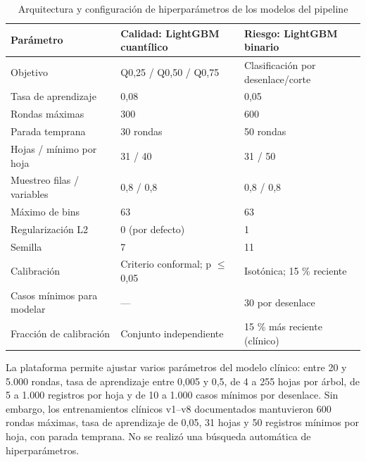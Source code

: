 \begin{table}[t]
\centering
\caption{Arquitectura y configuración de hiperparámetros de los modelos del pipeline}
\label{tab:1}
\footnotesize
\setlength{\tabcolsep}{2pt}
\begin{tabular}{@{}p{}p{}p{}@{}}
\toprule
\textbf{Parámetro} & \textbf{Calidad: LightGBM cuantílico} & \textbf{Riesgo: LightGBM binario} \\
\midrule
Objetivo & Q0,25 / Q0,50 / Q0,75 & Clasificación por desenlace/corte \\
Tasa de aprendizaje & 0,08 & 0,05 \\
Rondas máximas & 300 & 600 \\
Parada temprana & 30 rondas & 50 rondas \\
Hojas / mínimo por hoja & 31 / 40 & 31 / 50 \\
Muestreo filas / variables & 0,8 / 0,8 & 0,8 / 0,8 \\
Máximo de bins & 63 & 63 \\
Regularización L2 & 0 (por defecto) & 1 \\
Semilla & 7 & 11 \\
Calibración & Criterio conformal; p $\leq$ 0,05 & Isotónica; 15 \% reciente \\
Casos mínimos para modelar & --- & 30 por desenlace \\
Fracción de calibración & Conjunto independiente & 15 \% más reciente (clínico) \\
\bottomrule
\end{tabular}
\end{table}

La plataforma permite ajustar varios parámetros del modelo clínico: entre 20 y 5.000 rondas, tasa de aprendizaje entre 0,005 y 0,5, de 4 a 255 hojas por árbol, de 5 a 1.000 registros por hoja y de 10 a 1.000 casos mínimos por desenlace. Sin embargo, los entrenamientos clínicos v1--v8 documentados mantuvieron 600 rondas máximas, tasa de aprendizaje de 0,05, 31 hojas y 50 registros mínimos por hoja, con parada temprana. No se realizó una búsqueda automática de hiperparámetros.


